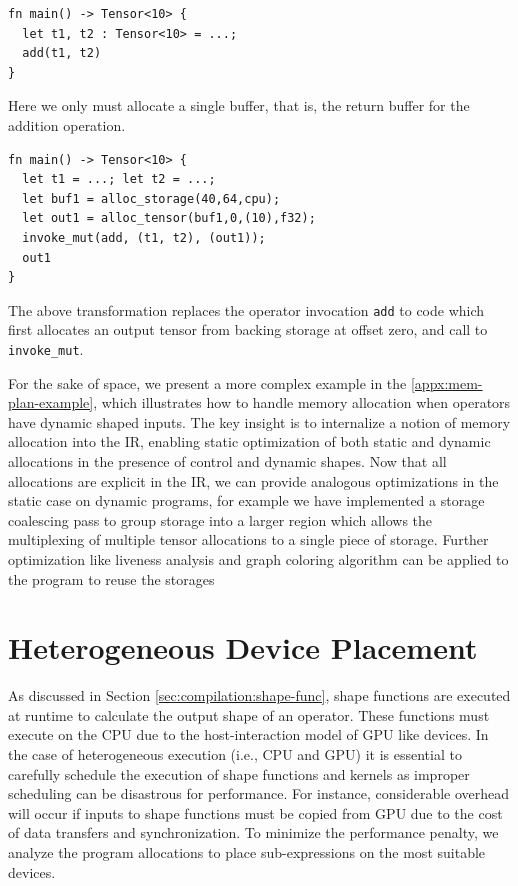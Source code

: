 \begin{verbatim}
fn main() -> Tensor<10> {
  let t1, t2 : Tensor<10> = ...;
  add(t1, t2)
}
\end{verbatim}

Here we only must allocate a single buffer, that is, the return buffer for the addition operation.

\begin{verbatim}
fn main() -> Tensor<10> {
  let t1 = ...; let t2 = ...;
  let buf1 = alloc_storage(40,64,cpu);
  let out1 = alloc_tensor(buf1,0,(10),f32);
  invoke_mut(add, (t1, t2), (out1));
  out1
}
\end{verbatim}

The above transformation replaces the operator invocation \verb|add| to code which
first allocates an output tensor from backing storage at offset zero, and call to
\verb|invoke_mut|.

For the sake of space, we present a more complex example in the \autoref{appx:mem-plan-example}, which illustrates how to handle memory allocation when operators have dynamic shaped inputs.
The key insight is to internalize a notion of memory allocation into the IR, enabling static optimization of
both static and dynamic allocations in the presence of control and dynamic shapes.
Now that all allocations are explicit in the IR, we can provide analogous optimizations in the static
case on dynamic programs, for example we have implemented a storage coalescing pass to group storage
into a larger region which allows the multiplexing of multiple tensor allocations to a single piece of storage.
Further optimization like liveness analysis and graph coloring algorithm can be applied to the program to reuse  the storages

\section{Heterogeneous Device Placement}
\label{sec:compliation:hetero}
As discussed in Section \autoref{sec:compilation:shape-func}, shape functions are executed at runtime to calculate the output shape of an operator. These functions must execute on the CPU due to the host-interaction model of GPU like devices. In the case of heterogeneous execution (i.e., CPU and GPU) it is essential to carefully schedule the execution of shape functions and kernels as improper scheduling can be disastrous for performance. For instance, considerable overhead will occur if inputs to shape functions must be copied from GPU due to the cost of data transfers and synchronization. To minimize the performance penalty, we analyze the program allocations to place sub-expressions on the most suitable devices.

